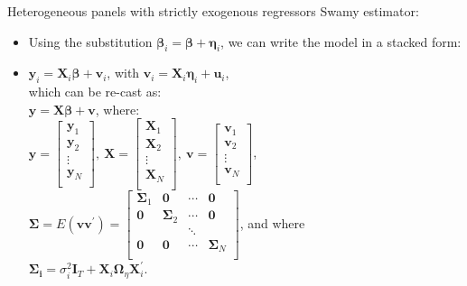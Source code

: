 \documentclass[usenames,dvipsnames]{beamer}
\begin{document}
\begin{frame}{Heterogeneous panels with strictly exogenous regressors}
Swamy estimator:\\ \smallskip
    \begin{itemize}
        \item Using the substitution $\bm{\beta}_{i}=\bm{\beta}+\bm{\eta}_i$, we can write the model in a stacked form:\\ \smallskip
        \item $\bm{y}_i = \bm{X}_i\bm{\beta}+\bm{v}_i$, \qquad 
        with \qquad 
        $\bm{v}_i=\bm{X}_i\bm{\eta}_i+\bm{u}_i$,\\ \medskip
        which can be re-cast as:\\ \medskip
        $\bm{y}= \bm{X \beta} + \bm{v}$,
        where:\\ \footnotesize \medskip
        $\bm{y}\! = \!\begin{bmatrix}
    \bm{y}_1 \\ \bm{y}_2 \\ \vdots \\ \bm{y}_N \\ 
    \end{bmatrix}\!,~ \bm{X}\! =\!
    \begin{bmatrix}
    \bm{X}_1 \\ \bm{X}_2 \\ \vdots \\ \bm{X}_N \\ 
    \end{bmatrix}\!,~ \bm{v} \!=\!
    \begin{bmatrix}
    \bm{v}_1 \\ \bm{v}_2 \\ \vdots \\ \bm{v}_N \\ 
    \end{bmatrix}$,\\ \medskip
    $\bm{\Sigma} = E(\bm{vv}^{\prime})\!=\!
    \begin{bmatrix} 
    \bm{\Sigma}_1 & \bm{0} & \cdots & \bm{0} \\ 
    \bm{0} & \bm{\Sigma}_2 & \cdots & \bm{0} \\ 
      &   & \ddots &  \\ 
    \bm{0} & \bm{0} & \cdots & \bm{\Sigma}_N \\ 
    \end{bmatrix}\!$, \quad and where \\ \smallskip
    $\bm{\Sigma_i} = \sigma_i^2 \bm{I}_T + \bm{X}_i \bm{\Omega}_{\eta} \bm{X}_i^{\prime}$.
    \end{itemize}
\end{frame}
\end{document}
